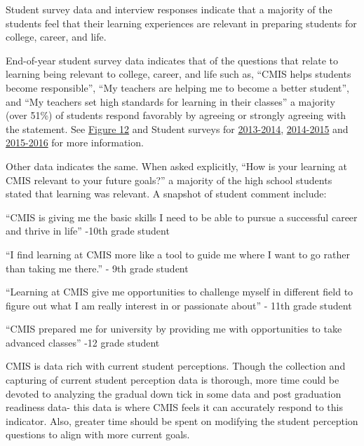 \documentclass{report}
\begin{document}
\begin{findings}

Student survey data and interview responses indicate that a majority of the students feel that their learning experiences are relevant in preparing students for  college, career, and life. 

End-of-year student survey data indicates that of the questions that relate to learning being relevant to college, career, and life such as, “CMIS helps students become responsible”, “My teachers are helping me to become a better student”, and “My teachers set high standards for learning in their classes” a majority (over 51\%) of students respond favorably by agreeing or strongly agreeing with the statement.  See \href{https://docs.google.com/document/d/1DO6UYDibCyF0wjGx1Pi7tgKJYMqpfjzTcICvsf8UUWM/edit}{Figure 12} and Student surveys for  \href{https://docs.google.com/a/cmis.ac.th/forms/d/1EbMhxXKv9boAXmuwqmldZCbHKNY-aREq56IW2N-eviI/viewanalytics}{2013-2014}, \href{https://docs.google.com/a/cmis.ac.th/forms/d/1qbAnJ69O0ZRUPmBFvQaglObvnyoUkVd4hQiyaAFO7_I/viewanalytics}{2014-2015} and \href{https://docs.google.com/a/cmis.ac.th/forms/d/1n7vFCQbPQmF6pEPJKPBsu4rzdiW4KQ_DrBcjTMUbLH4/edit?ts=587d7b50#responses}{2015-2016} for more information. 

Other data indicates the same. When asked explicitly, “How is your learning at CMIS relevant to your future goals?” a majority of the high school students stated that learning was relevant.  A snapshot of student comment include: 

``CMIS is giving me the basic skills I need to be able to pursue a successful career and thrive in life'' -10th grade student
 
``I find learning at CMIS more like a tool to guide me where I want to go rather than taking me there.'' - 9th grade student 

``Learning at CMIS give me opportunities to challenge myself in different field to figure out what I am really interest in or passionate about'' - 11th grade student

``CMIS prepared me for university by  providing me with opportunities  to take advanced classes'' -12 grade student 


CMIS is data rich with current student perceptions. Though the collection and capturing of current student perception data is thorough, more time could be devoted to analyzing the gradual down tick in some data and post graduation readiness data- this data is where CMIS feels it can accurately respond to this indicator. Also, greater time should be spent on modifying the student perception questions to align with more current goals.  
\end{findings}
\end{document}
